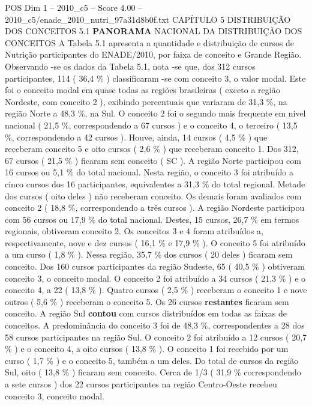 \begin{textsample}{POS Dim 1 – 2010\_c5 – Score 4.00 – 2010\_c5/enade\_2010\_nutri\_97a31d8b0f.txt}  \label{ex:f1_pos_134}
CAPÍTULO 5 DISTRIBUIÇÃO DOS CONCEITOS 5.1 \textbf{PANORAMA} NACIONAL DA DISTRIBUIÇÃO DOS CONCEITOS A Tabela 5.1 apresenta a quantidade e distribuição de cursos de Nutrição participantes do ENADE/2010, por faixa de conceito e Grande Região.
Observando -se os dados da Tabela 5.1, nota -se que, dos 312 cursos participantes, 114 ( 36,4 \% ) classificaram -se com conceito 3, o valor modal.
Este foi o conceito modal em quase todas as regiões brasileiras ( exceto a região Nordeste, com conceito 2 ), exibindo percentuais que variaram de 31,3 \%, na região Norte a 48,3 \%, na Sul.
O conceito 2 foi o segundo mais frequente em nível nacional ( 21,5 \%, correspondendo a 67 cursos ) e o conceito 4, o terceiro ( 13,5 \%, correspondendo a 42 cursos ).
Houve, ainda, 14 cursos ( 4,5 \% ) que receberam conceito 5 e oito cursos ( 2,6 \% ) que receberam conceito 1.
Dos 312, 67 cursos ( 21,5 \% ) ficaram sem conceito ( SC ).
A região Norte participou com 16 cursos ou 5,1 \% do total nacional.
Nesta região, o conceito 3 foi atribuído a cinco cursos dos 16 participantes, equivalentes a 31,3 \% do total regional.
Metade dos cursos ( oito deles ) não receberam conceito.
Os demais foram avaliados com conceito 2 ( 18,8 \%, correspondendo a três cursos ).
A região Nordeste participou com 56 cursos ou 17,9 \% do total nacional.
Destes, 15 cursos, 26,7 \% em termos regionais, obtiveram conceito 2.
Os conceitos 3 e 4 foram atribuídos a, respectivamente, nove e dez cursos ( 16,1 \% e 17,9 \% ).
O conceito 5 foi atribuído a um curso ( 1,8 \% ).
Nessa região, 35,7 \% dos cursos ( 20 deles ) ficaram sem conceito.
Dos 160 cursos participantes da região Sudeste, 65 ( 40,5 \% ) obtiveram conceito 3, o conceito modal.
O conceito 2 foi atribuído a 34 cursos ( 21,3 \% ) e o conceito 4, a 22 ( 13,8 \% ).
Quatro cursos ( 2,5 \% ) receberam o conceito 1 e nove outros ( 5,6 \% ) receberam o conceito 5.
Os 26 cursos \textbf{restantes} ficaram sem conceito.
A região Sul \textbf{contou} com cursos distribuídos em todas as faixas de conceitos.
A predominância do conceito 3 foi de 48,3 \%, correspondentes a 28 dos 58 cursos participantes na região Sul.
O conceito 2 foi atribuído a 12 cursos ( 20,7 \% ) e o conceito 4, a oito cursos ( 13,8 \% ).
O conceito 1 foi recebido por um curso ( 1,7 \% ) e o conceito 5, também a um deles.
Do total de cursos da região Sul, oito ( 13,8 \% ) ficaram sem conceito.
Cerca de 1/3 ( 31,9 \% correspondendo a sete cursos ) dos 22 cursos participantes na região Centro-Oeste recebeu conceito 3, conceito modal.

\end{textsample}
